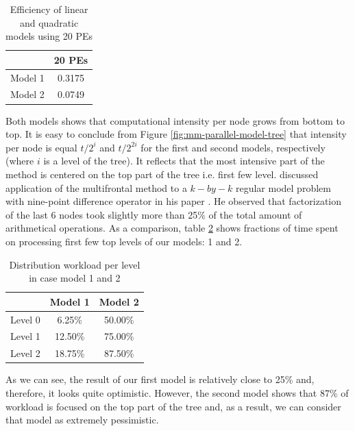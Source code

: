 \begin{table}[htpb]
\centering
\begin{tabular}{|c|c|}
\hline
        & 20 PEs \\ \hline
Model 1 & 0.3175 \\ \hline
Model 2 & 0.0749 \\ \hline
\end{tabular}
\caption{Efficiency of linear and quadratic models using 20 PEs}
\label{table:mm-model-efficiency-20-pe}
\end{table}


Both models shows that computational intensity per node grows from bottom to top. It is easy to conclude from Figure \ref{fig:mm-parallel-model-tree} that intensity per node is equal $t/2^{i}$ and $t/2^{2i}$ for the first and second models, respectively (where $i$ is a level of the tree). It reflects that the most intensive part of the method is centered on the top part of the tree i.e. first few level. \citeauthor{mult-frontal-original:2} discussed application of the multifrontal method to a $k-by-k$ regular model problem with nine-point difference operator in his paper \cite{mult-frontal-original:2}. He observed that factorization of the last 6 nodes took slightly more than 25\% of the total amount of arithmetical operations. As a comparison, table \ref{table:mm-simple-model-work-load} shows fractions of time spent on processing first few top levels of our models: 1 and 2.\\


\begin{table}[htpb]
\centering
\begin{tabular}{|c|c|c|}
\hline
        & Model 1 & Model 2 \\ \hline
Level 0 & 6.25\%  & 50.00\% \\ \hline
Level 1 & 12.50\% & 75.00\% \\ \hline
Level 2 & 18.75\% & 87.50\% \\ \hline

\end{tabular}
\caption{Distribution workload per level in case model 1 and 2}
\label{table:mm-simple-model-work-load}
\end{table}


As we can see, the result of our first model is relatively close to 25\% and, therefore, it looks quite optimistic. However, the second model shows that 87\% of workload is focused on the top part of the tree and, as a result, we can consider that model as extremely pessimistic. \\


